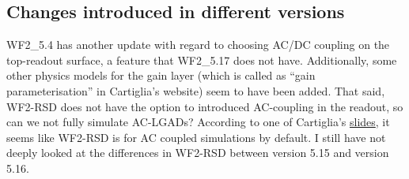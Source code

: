 \documentclass[11pt]{article}
\begin{document}
\subsection{Changes introduced in different versions}
WF2\_5.4 has another update with regard to choosing AC/DC coupling on the top-readout surface, a feature that WF2\_5.17 does not have. Additionally, some other physics models for the gain layer (which is called as ``gain parameterisation'' in Cartiglia's website) seem to have been added.
\newline
That said, WF2-RSD does not have the option to introduced AC-coupling in the readout, so can we not fully simulate AC-LGADs? According to one of Cartiglia's \href{https://indico.cern.ch/event/928957/contributions/3913535/attachments/2069369/3473666/FCCee_Cartiglia.pdf}{slides}, it seems like WF2-RSD is for AC coupled simulations by default.
\newline
I still have not deeply looked at the differences in WF2-RSD between version 5.15 and version 5.16.


\end{document}
